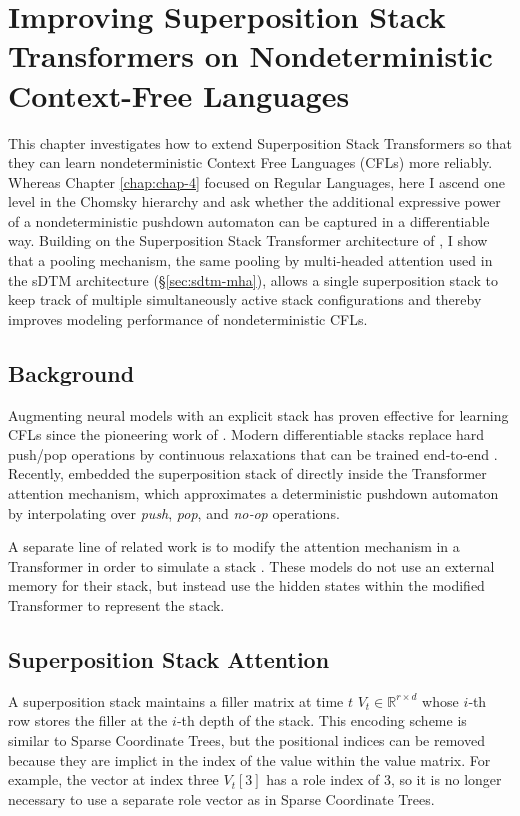\chapter{Improving Superposition Stack Transformers on Nondeterministic Context-Free Languages} \label{chap:chap-5}


This chapter investigates how to extend Superposition Stack Transformers \citep{dusell2024stack} so that they can learn nondeterministic Context Free Languages (CFLs) more reliably.  Whereas Chapter \ref{chap:chap-4} focused on Regular Languages, here I ascend one level in the Chomsky hierarchy and ask whether the additional expressive power of a nondeterministic pushdown automaton can be captured in a differentiable way.  Building on the Superposition Stack Transformer architecture of \citet{dusell2024stack}, I show that a pooling mechanism, the same pooling by multi-headed attention used in the sDTM architecture (\S\ref{sec:sdtm-mha}), allows a single superposition stack to keep track of multiple simultaneously active stack configurations and thereby improves modeling performance of nondeterministic CFLs.

\section{Background}
Augmenting neural models with an explicit stack has proven effective for learning CFLs since the pioneering work of \citet{das1992learning}.  Modern differentiable stacks replace hard push/pop operations by continuous relaxations that can be trained end‑to‑end \citep{joulin2015inferring, grefenstette2015learning}.  Recently, \citet{dusell2024stack} embedded the superposition stack of \citet{joulin2015inferring} directly inside the Transformer attention mechanism, which approximates a deterministic pushdown automaton by interpolating over \textit{push}, \textit{pop}, and \textit{no‑op} operations.

A separate line of related work is to modify the attention mechanism in a Transformer in order to simulate a stack \citep{murty_pushdown_2023, sartran2022transformer, li_transformer_2024}. These models do not use an external memory for their stack, but instead use the hidden states within the modified Transformer to represent the stack.

\section{Superposition Stack Attention}
A superposition stack maintains a filler matrix at time $t$ $V_t \in \mathbb{R}^{r\times d}$ whose $i$‑th row stores the filler at the $i$‑th depth of the stack. This encoding scheme is similar to Sparse Coordinate Trees, but the positional indices can be removed because they are implict in the index of the value within the value matrix. For example, the vector at index three $V_t[3]$ has a role index of 3, so it is no longer necessary to use a separate role vector as in Sparse Coordinate Trees.

